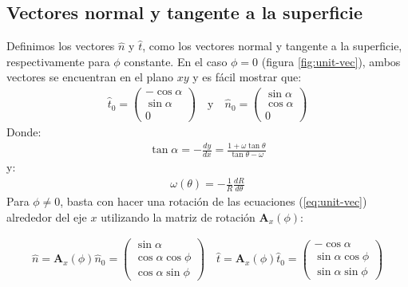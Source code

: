 \subsection{Vectores normal y tangente a la superficie}

Definimos los vectores $\hat{n}$ y $\hat{t}$, como los vectores normal y tangente a la superficie, respectivamente para $\phi$ constante. En el caso $\phi = 0$ (figura \ref{fig:unit-vec}), ambos vectores se encuentran en el plano $xy$ y es fácil mostrar que:
\begin{align}
  \hat{t}_0 =
  \left(
  \begin{array}{c}
    -\cos\alpha \\
    \sin\alpha \\
    0
  \end{array}
  \right)
  \quad \mathrm{y} \quad
  \hat{n}_0 =
  \left(
  \begin{array}{c}
    \sin\alpha \\
    \cos\alpha \\
    0
  \end{array}
  \right)
  \label{eq:unit-vec}
\end{align}
Donde:
\begin{align}
  \tan\alpha = -\frac{dy}{dx} = \frac{1+\omega\tan\theta}{\tan\theta-\omega} \label{eq:tan-alpha}
\end{align}
y:
\begin{align}
  \omega(\theta) = -\frac{1}{R}\frac{dR}{d\theta} 
\end{align}
Para $\phi \neq 0$, basta con hacer una rotación de las ecuaciones (\ref{eq:unit-vec}) alrededor del eje $x$ utilizando la matriz de rotación $\mathbf{A}_x(\phi)$:

\begin{align}
  \hat{n} = \mathbf{A}_x(\phi)\hat{n}_0 =
 \left(
  \begin{array}{c}
    \sin\alpha \\
    \cos\alpha\cos\phi \\
    \cos\alpha\sin\phi
  \end{array}
  \right) \quad
    \hat{t} = \mathbf{A}_x(\phi)\hat{t}_0 =
 \left(
  \begin{array}{c}
    -\cos\alpha \\
    \sin\alpha\cos\phi \\
    \sin\alpha\sin\phi
  \end{array}
  \right)
\end{align}

